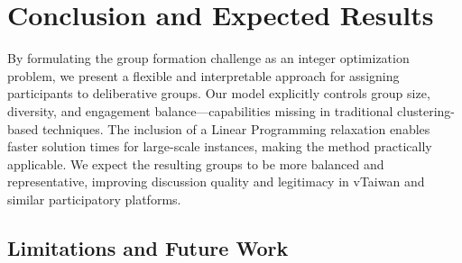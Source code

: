 \section{Conclusion and Expected Results}\label{sec:conclusion}

By formulating the group formation challenge as an integer optimization problem,
we present a flexible and interpretable approach for assigning participants to deliberative groups.
Our model explicitly controls group size, diversity,
and engagement balance—capabilities missing in traditional clustering-based techniques.
The inclusion of a Linear Programming relaxation enables faster solution times for large-scale instances,
making the method practically applicable.
We expect the resulting groups to be more balanced and representative, improving discussion quality
and legitimacy in vTaiwan and similar participatory platforms.

\subsection*{Limitations and Future Work}
